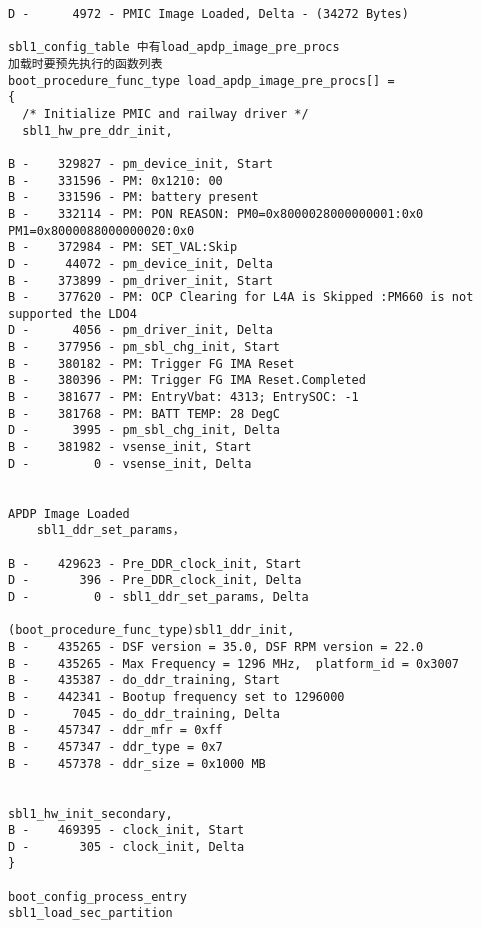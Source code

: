 \begin{lstlisting}
D -      4972 - PMIC Image Loaded, Delta - (34272 Bytes)

sbl1_config_table 中有load_apdp_image_pre_procs
加载时要预先执行的函数列表
boot_procedure_func_type load_apdp_image_pre_procs[] = 
{
  /* Initialize PMIC and railway driver */
  sbl1_hw_pre_ddr_init,

B -    329827 - pm_device_init, Start
B -    331596 - PM: 0x1210: 00
B -    331596 - PM: battery present
B -    332114 - PM: PON REASON: PM0=0x8000028000000001:0x0 PM1=0x8000088000000020:0x0 
B -    372984 - PM: SET_VAL:Skip
D -     44072 - pm_device_init, Delta
B -    373899 - pm_driver_init, Start
B -    377620 - PM: OCP Clearing for L4A is Skipped :PM660 is not supported the LDO4
D -      4056 - pm_driver_init, Delta
B -    377956 - pm_sbl_chg_init, Start
B -    380182 - PM: Trigger FG IMA Reset
B -    380396 - PM: Trigger FG IMA Reset.Completed
B -    381677 - PM: EntryVbat: 4313; EntrySOC: -1
B -    381768 - PM: BATT TEMP: 28 DegC
D -      3995 - pm_sbl_chg_init, Delta
B -    381982 - vsense_init, Start
D -         0 - vsense_init, Delta


APDP Image Loaded
	sbl1_ddr_set_params，

B -    429623 - Pre_DDR_clock_init, Start
D -       396 - Pre_DDR_clock_init, Delta
D -         0 - sbl1_ddr_set_params, Delta

(boot_procedure_func_type)sbl1_ddr_init,
B -    435265 - DSF version = 35.0, DSF RPM version = 22.0
B -    435265 - Max Frequency = 1296 MHz,  platform_id = 0x3007
B -    435387 - do_ddr_training, Start
B -    442341 - Bootup frequency set to 1296000
D -      7045 - do_ddr_training, Delta
B -    457347 - ddr_mfr = 0xff
B -    457347 - ddr_type = 0x7
B -    457378 - ddr_size = 0x1000 MB


sbl1_hw_init_secondary,
B -    469395 - clock_init, Start
D -       305 - clock_init, Delta
}

boot_config_process_entry
sbl1_load_sec_partition


\end{lstlisting}
